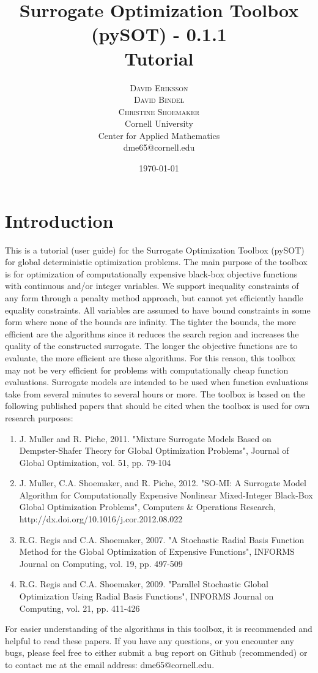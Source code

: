 \documentclass[]{article}
\title{\vspace{-15mm}%
	\fontsize{18pt}{10pt}\selectfont
	\textbf{Surrogate Optimization Toolbox (pySOT) - 0.1.1 \\ Tutorial}
	}
\author{%
	\Large\textsc{David Eriksson} \\[2mm]
	\Large\textsc{David Bindel} \\[2mm]
	\Large\textsc{Christine Shoemaker} \\[2mm]
		\normalsize	Cornell University \\
	\normalsize Center for Applied Mathematics \\
	\normalsize	dme65@cornell.edu \\ 
	}
\date{\today}
\begin{document}
\fontsize{12}{14}\rm

\maketitle
\thispagestyle{fancy}
\tableofcontents

\section{Introduction}
This is a tutorial (user guide) for the Surrogate Optimization Toolbox (pySOT) for global deterministic optimization problems. The main purpose of the toolbox is for optimization of computationally expensive black-box objective functions with continuous and/or integer variables. We support inequality constraints of any form through a penalty method approach, but cannot yet efficiently handle equality constraints. All variables are assumed to have bound constraints in some form where none of the bounds are infinity. The tighter the bounds, the more efficient are the algorithms since it reduces the search region and increases the quality of the constructed surrogate. The longer the objective functions are to evaluate, the more efficient are these algorithms. For this reason, this toolbox may not be very efficient for problems with computationally cheap function evaluations. Surrogate models are intended to be used when function evaluations take from several minutes to several hours or more. The toolbox is based on the following published papers that should be cited when the toolbox is used for own research purposes:
\begin{enumerate}
\item J. Muller and R. Piche, 2011. "Mixture Surrogate Models Based on Dempster-Shafer Theory for Global Optimization Problems", Journal of Global Optimization, vol. 51, pp. 79-104
\item J. Muller, C.A. Shoemaker, and R. Piche, 2012. "SO-MI: A Surrogate Model Algorithm for Computationally Expensive Nonlinear Mixed-Integer Black-Box Global Optimization Problems", Computers \& Operations Research, \\ http://dx.doi.org/10.1016/j.cor.2012.08.022
\item R.G. Regis and C.A. Shoemaker, 2007. "A Stochastic Radial Basis Function Method for the Global Optimization of Expensive Functions", INFORMS Journal on Computing, vol. 19, pp. 497-509
\item R.G. Regis and C.A. Shoemaker, 2009. "Parallel Stochastic Global Optimization Using Radial Basis Functions", INFORMS Journal on Computing, vol. 21, pp. 411-426
\end{enumerate}
For easier understanding of the algorithms in this toolbox, it is recommended and helpful to read these papers. If you have any questions, or you encounter any bugs, please feel free to either submit a bug report on Github (recommended) or to contact me at the email address: dme65@cornell.edu.
\end{document}

